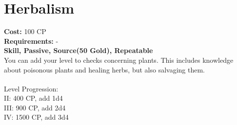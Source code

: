 \section{Herbalism}
\textbf{Cost:} 100 CP\\
\textbf{Requirements:} -\\
\textbf{Skill, Passive, Source(50 Gold), Repeatable}\\
You can add your level to checks concerning plants. This includes knowledge about poisonous plants and healing herbs, but also salvaging them.\\
\\
Level Progression:\\
II: 400 CP, add 1d4\\
III: 900 CP, add 2d4\\
IV: 1500 CP, add 3d4\\
